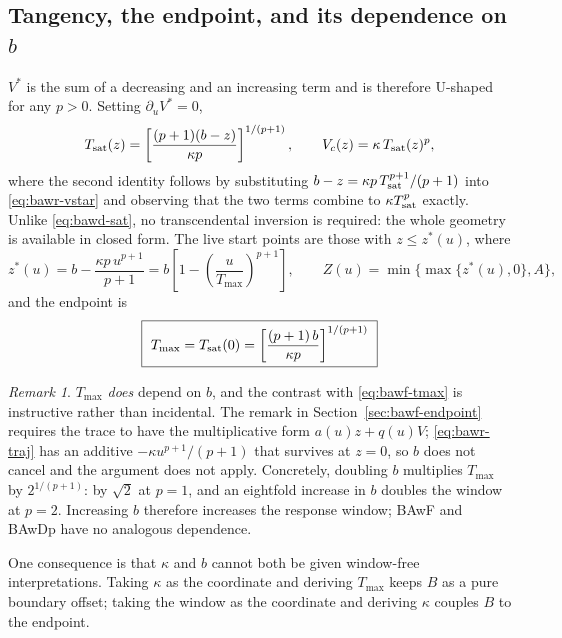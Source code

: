 \documentclass[12pt]{article}
\theoremstyle{remark}
\newtheorem{remark}{Remark}
\begin{document}
\subsection{Tangency, the endpoint, and its dependence on $b$}
$V^{*}$ is the sum of a decreasing and an increasing term and is therefore U-shaped for any $p>0$. Setting $\partial_uV^{*}=0$,
\begin{equation}
  T_{\rm sat}(z)
  = \left[\frac{(p+1)(b-z)}{\kappa p}\right]^{1/(p+1)},
  \qquad
  V_c(z) = \kappa\,T_{\rm sat}(z)^{p},
  \label{eq:bawr-sat}
\end{equation}
where the second identity follows by substituting $b-z=\kappa p\,T_{\rm sat}^{p+1}/(p+1)$ into \eqref{eq:bawr-vstar} and observing that the two terms combine to $\kappa T_{\rm sat}^{p}$ exactly. Unlike \eqref{eq:bawd-sat}, no transcendental inversion is required: the whole geometry is available in closed form. The live start points are those with $z\le z^{*}(u)$, where
\begin{equation}
  z^{*}(u) = b - \frac{\kappa p\,u^{p+1}}{p+1}
           = b\left[1-\left(\frac{u}{T_{\max}}\right)^{p+1}\right],
  \qquad
  Z(u)=\min\{\max\{z^{*}(u),0\},A\},
  \label{eq:bawr-Z}
\end{equation}
and the endpoint is
\begin{equation}
  \boxed{\ T_{\max} = T_{\rm sat}(0)
        = \left[\frac{(p+1)\,b}{\kappa p}\right]^{1/(p+1)}\ }
  \label{eq:bawr-tmax}
\end{equation}

\begin{remark}
$T_{\max}$ \emph{does} depend on $b$, and the contrast with
\eqref{eq:bawf-tmax} is instructive rather than incidental. The remark in
Section~\ref{sec:bawf-endpoint} requires the trace to have the multiplicative form $a(u)z+q(u)V$; \eqref{eq:bawr-traj} has an additive $-\kappa u^{p+1}/(p+1)$ that survives at $z=0$, so $b$ does not cancel and the argument does not apply. Concretely, doubling $b$ multiplies $T_{\max}$ by $2^{1/(p+1)}$: by $\sqrt2$ at $p=1$, and an eightfold increase in $b$ doubles the window at $p=2$. Increasing $b$ therefore increases the response window; BAwF and BAwDp have no analogous dependence.

One consequence is that $\kappa$ and $b$ cannot both be given window-free interpretations. Taking $\kappa$ as the coordinate and deriving $T_{\max}$ keeps $B$ as a pure boundary offset; taking the window as the coordinate and deriving $\kappa$ couples $B$ to the endpoint.
\end{remark}
\end{document}
